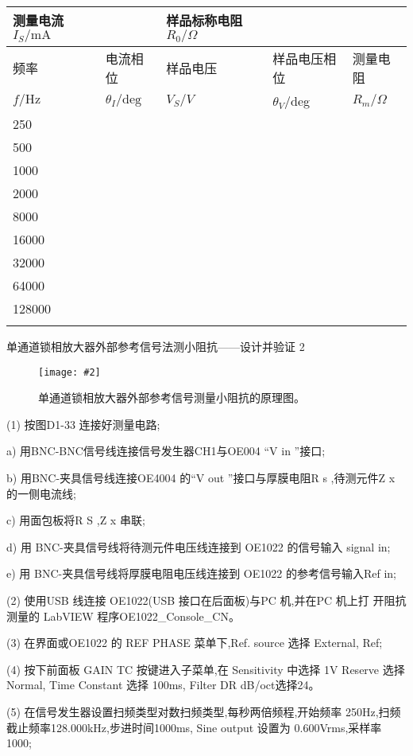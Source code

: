 \documentclass[11pt,a4paper]{ctexart}
\newcommand{\cpic}[2]{
\begin{center}
\texttt{[image: \#2]}
\end{center}
}
\newcommand{\cpicn}[3]
{
\begin{figure}[H]
\cpic{#1}{#2}
\caption{\color{red}#3\label{#2}}
\end{figure}
}
\begin{document}
\begin{tabular}{|l|l|l|l|l|}
\hline
测量电流$I_S/\mathrm{mA}$ &      & 样品标称电阻$R_0/\Omega$ &        &      \\ \hline
频率   & 电流相位 & 样品电压& 样品电压相位 & 测量电阻 \\
$f/\mathrm{Hz}$&$\theta_I/\mathrm{deg}$&$V_S/V$&$\theta_V$/deg &$R_m/\Omega$ \\\hline
250 &      &        &        &      \\\hline
500 &      &        &        &      \\\hline
1000 &      &        &        &      \\\hline
2000 &      &        &        &      \\\hline
8000&      &        &        &      \\\hline
16000 &      &        &        &      \\\hline
32000 &      &        &        &      \\\hline
64000 &      &        &        &      \\\hline
128000&      &        &        &      \\\hline
&      &        &        &      \\\hline
\end{tabular}

单通道锁相放大器外部参考信号法测小阻抗——设计并验证 2

\cpicn{0.5}{hint_2}{单通道锁相放大器外部参考信号测量小阻抗的原理图。}
(1) 按图D1-33 连接好测量电路;

a) 用BNC-BNC信号线连接信号发生器CH1与OE004 “V in ”接口;

b) 用BNC-夹具信号线连接OE4004 的“V out ”接口与厚膜电阻R s ,待测元件Z x
的一侧电流线;

c) 用面包板将R S ,Z x 串联;

d) 用 BNC-夹具信号线将待测元件电压线连接到 OE1022 的信号输入 signal
in;

e) 用 BNC-夹具信号线将厚膜电阻电压线连接到 OE1022 的参考信号输入Ref
in;

(2) 使用USB 线连接 OE1022(USB 接口在后面板)与PC 机,并在PC 机上打
开阻抗测量的 LabVIEW 程序OE1022\_Console\_CN。

(3) 在界面或OE1022 的 REF PHASE 菜单下,Ref. source 选择 External,
Ref;

(4) 按下前面板 GAIN TC 按键进入子菜单,在 Sensitivity 中选择 1V
Reserve 选择 Normal, Time Constant 选择 100ms, Filter DR dB/oct选择24。

(5) 在信号发生器设置扫频类型对数扫频类型,每秒两倍频程,开始频率
250Hz,扫频截止频率128.000kHz,步进时间1000ms, Sine output 设置为
0.600Vrms,采样率1000;
\end{document}
